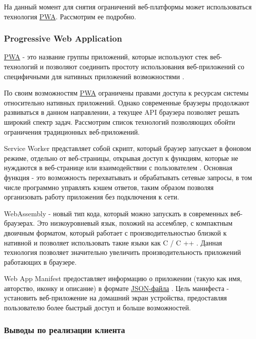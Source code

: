 На данный момент для снятия ограничений веб-платформы может использоваться технология \hyperlink{pwa}{PWA}. Рассмотрим ее подробно.

\subsubsection{Progressive Web Application}

\hyperlink{pwa}{PWA} - это название группы приложений, которые используют стек веб-технологий и позволяют соединить простоту использования веб-приложений со специфичными для нативных приложений  возможностями \cite{progressive-web-applications}.

По своим возможностям \hyperlink{pwa}{PWA} ограничены правами доступа к ресурсам системы относительно нативных приложений.
Однако современные браузеры продолжают развиваться в данном направлении, а текущее API браузера позволяет решать широкий спектр задач.
Рассмотрим список технологий позволяющих обойти ограничения традиционных веб-приложений.

Service Worker представляет собой скрипт, который браузер запускает в фоновом режиме, отдельно от веб-страницы, открывая доступ к функциям, которые не нуждаются в веб-странице или взаимодействии с пользователем \cite{service-worker}.
Основная функция - это возможность перехватывать и обрабатывать сетевые запросы, в том числе программно управлять кэшем ответов, таким образом позволяя организовать работу приложения без подключения к сети.

WebAssembly - новый тип кода, который можно запускать в современных веб-браузерах. Это низкоуровневый язык, похожий на ассемблер, с компактным двоичным форматом, который работает с производительностью близкой к нативной и позволяет использовать такие языки как C / C ++ \cite{web-assembly}.
Данная технология позволяет значительно увеличить производительность приложений работающих в браузере.

Web App Manifest предоставляет информацию о приложении (такую как имя, авторство, иконку и описание) в формате \hyperlink{json}{JSON-файла} \cite{web-app-manifest}.
Цель манифеста - установить веб-приложение на домашний экран устройства, предоставляя пользователю более быстрый доступ и больше возможностей.

\subsubsection{Выводы по реализации клиента}

